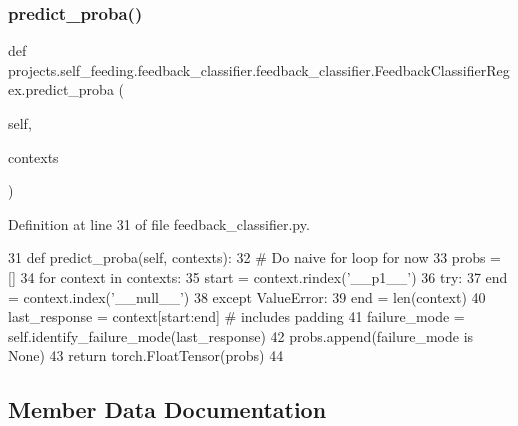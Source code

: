 \subsubsection{\texorpdfstring{predict\+\_\+proba()}{predict\_proba()}}
{\footnotesize\ttfamily def projects.\+self\+\_\+feeding.\+feedback\+\_\+classifier.\+feedback\+\_\+classifier.\+Feedback\+Classifier\+Regex.\+predict\+\_\+proba (\begin{DoxyParamCaption}\item[{}]{self,  }\item[{}]{contexts }\end{DoxyParamCaption})}



Definition at line 31 of file feedback\+\_\+classifier.\+py.


\begin{DoxyCode}
31     \textcolor{keyword}{def }predict\_proba(self, contexts):
32         \textcolor{comment}{# Do naive for loop for now}
33         probs = []
34         \textcolor{keywordflow}{for} context \textcolor{keywordflow}{in} contexts:
35             start = context.rindex(\textcolor{stringliteral}{'\_\_p1\_\_'})
36             \textcolor{keywordflow}{try}:
37                 end = context.index(\textcolor{stringliteral}{'\_\_null\_\_'})
38             \textcolor{keywordflow}{except} ValueError:
39                 end = len(context)
40             last\_response = context[start:end]  \textcolor{comment}{# includes padding}
41             failure\_mode = self.identify\_failure\_mode(last\_response)
42             probs.append(failure\_mode \textcolor{keywordflow}{is} \textcolor{keywordtype}{None})
43         \textcolor{keywordflow}{return} torch.FloatTensor(probs)
44 
\end{DoxyCode}


\subsection{Member Data Documentation}
\mbox{\label{classprojects_1_1self__feeding_1_1feedback__classifier_1_1feedback__classifier_1_1FeedbackClassifierRegex_a425d14474da43ffb0a75150fa04b26bc}} 
